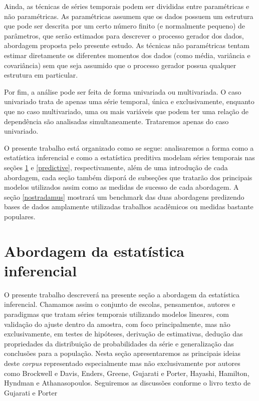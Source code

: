\documentclass[twocolumn]{rbef}
\newcommand{\1}{\mathbbm{1}}
\begin{document}
Ainda, as técnicas de séries temporais podem ser divididas entre paramétricas e não paramétricas. As paramétricas assumem que os dados possuem um estrutura que pode ser descrita por um certo número finito (e normalmente pequeno) de parâmetros, que serão estimados para descrever o processo gerador dos dados, abordagem proposta pelo presente estudo. As técnicas não paramétricas tentam estimar diretamente os diferentes momentos dos dados (como média, variância e covariância) sem que seja assumido que o processo gerador possua qualquer estrutura em particular.

Por fim, a análise pode ser feita de forma univariada ou multivariada. O caso univariado trata de apenas uma série temporal, única e exclusivamente, enquanto que no caso multivariado, uma ou mais variáveis que podem ter uma relação de dependência são analisadas simultaneamente. Trataremos apenas do caso univariado.


O presente trabalho está organizado como se segue: analisaremos a forma como a estatística inferencial e como a estatística preditiva modelam séries temporais nas seções \ref{inferential} e \ref{predictive}, respectivamente, além de uma introdução de cada abordagem, cada seção também disporá de subseções que tratarão dos principais modelos utilizados assim como as medidas de sucesso de cada abordagem. A seção \ref{nostradamus} mostrará um benchmark das duas abordagens predizendo bases de dados amplamente utilizadas trabalhos acadêmicos ou medidas bastante populares.

\section{Abordagem da estatística inferencial} \label{inferential}

O presente trabalho descreverá na presente seção a abordagem da estatística inferencial. Chamamos assim o conjunto de escolas, pensamentos, autores e paradigmas que tratam séries temporais utilizando modelos lineares, com validação do ajuste dentro da amostra, com foco principalmente, mas não exclusivamente, em testes de hipóteses, derivação de estimativas, dedução das propriedades da distribuição de probabilidades da série e generalização das conclusões para a população. Nesta seção apresentaremos as principais ideias deste \textit{corpus} representado especialmente mas não exclusivamente por autores como Brockwell e Davis\cite{Brockwell}, Enders\cite{Enders}, Greene\cite{Greene}, Gujarati e Porter\cite{Gujarati}, Hayashi\cite{Hayashi}, Hamilton\cite{Hamilton}, Hyndman e Athanasopoulos\cite{Hyndman}. Seguiremos as discussões conforme o livro texto de Gujarati e Porter \cite{Gujarati}
\end{document}
